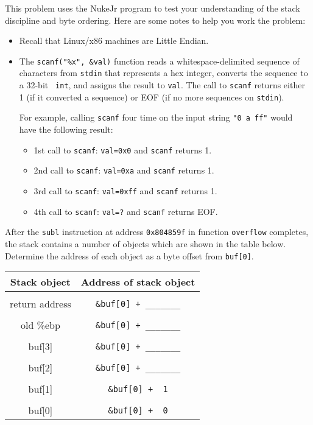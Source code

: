 \newpage
\begin{problem}{10}
This problem uses the NukeJr program to test 
your understanding of the stack discipline
and byte ordering. Here are some notes to help you work the problem:

\begin{itemize}
\item Recall that Linux/x86 machines are Little Endian.

\item The \verb:scanf("%x", &val): function 
reads a whitespace-delimited sequence of characters from {\tt stdin}
that represents a hex integer, converts the sequence to a 32-bit {\tt
int}, and assigns the result to {\tt val}.  The call to {\tt scanf}
returns either 1 (if it converted a sequence) or EOF (if no more sequences
on {\tt stdin}).
 
For example, calling {\tt scanf} four time on the input string
\verb:"0 a ff": would have the following result:
\begin{itemize}
\item 1st call to {\tt scanf}: {\tt val=0x0} and {\tt scanf} returns 1.
\item 2nd call to {\tt scanf}: {\tt val=0xa} and {\tt scanf} returns 1.
\item 3rd call to {\tt scanf}: {\tt val=0xff} and {\tt scanf} returns 1.
\item 4th call to {\tt scanf}: {\tt val=?} and {\tt scanf} returns EOF.
\end{itemize}

\end{itemize}

\begin{choice}

\item After the {\tt subl} instruction at address {\tt 0x804859f} in
function {\tt overflow} completes, the stack contains a number of
objects which are shown in the table below. Determine the address of
each object as a byte offset from {\tt buf[0]}.

\begin{tabular}{|c|c|}
\hline
Stack object & Address of stack object\\
\hline
\hline
&\\
return address & \verb:&buf[0] + _______:\\ %
&\\
old \%ebp      & \verb:&buf[0] + _______:\\ %
&\\
buf[3]         & \verb:&buf[0] + _______:\\ %
&\\
buf[2]         & \verb:&buf[0] + _______:\\ %
&\\
buf[1]         & \verb:&buf[0] +  1:\\
&\\
buf[0]         & \verb:&buf[0] +  0:\\
\hline
\end{tabular}



\end{choice}
\end{problem}
